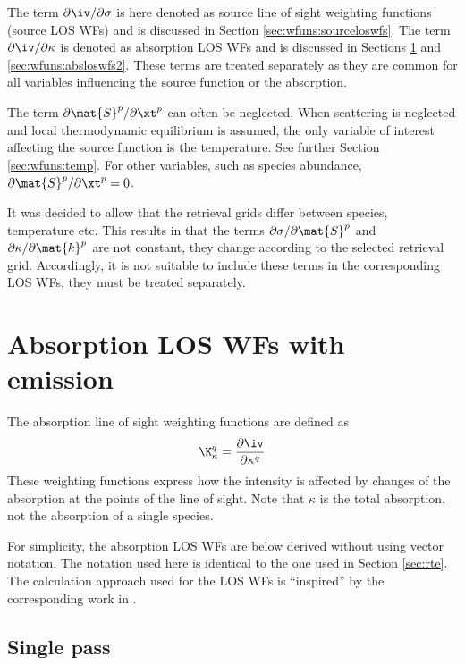   The term $\partial\iv / \partial \sigma$ is here denoted as source
  line of sight weighting functions (source LOS WFs) and is discussed
  in Section \ref{sec:wfuns:sourceloswfs}. The term $\partial\iv/
  \partial \kappa$ is denoted as absorption LOS WFs and is discussed
  in Sections \ref{sec:wfuns:absloswfs} and
  \ref{sec:wfuns:absloswfs2}. These terms are treated separately as
  they are common for all variables influencing the source function or
  the absorption.

  The term $\partial \mat{S}^p/\partial \xt^p$ can often be neglected.
  When scattering is neglected and local thermodynamic equilibrium is
  assumed, the only variable of interest affecting the source function
  is the temperature.  See further Section \ref{sec:wfuns:temp}. For
  other variables, such as species abundance, $\partial
  \mat{S}^p/\partial \xt^p=0$.
  
  It was decided to allow that the retrieval grids differ between
  species, temperature etc. This results in that the terms $\partial
  \sigma/ \partial \mat{S}^p$ and $\partial \kappa/ \partial
  \mat{k}^p$ are not constant, they change according to the selected
  retrieval grid. Accordingly, it is not suitable to include these terms
  in the corresponding LOS WFs, they must be treated separately.
  
  

\section{Absorption LOS WFs with emission}
 \label{sec:wfuns:absloswfs}

 The absorption line of sight weighting functions are defined as
 \begin{equation}
   \K_{\kappa}^q =  \frac{\partial\iv}{\partial \kappa^q}
  \label{eq:wfuns:loswfs}
 \end{equation}
 These weighting functions express how the intensity is
 affected by changes of the absorption at the points of the line of
 sight. Note that $\kappa$ is the total absorption, not the
 absorption of a single species. 
 
 For simplicity, the absorption LOS WFs are below derived without
 using vector notation. The notation used here is identical to the one
 used in Section \ref{sec:rte}. The calculation approach used for the
 LOS WFs is ``inspired'' by the corresponding work in
 \citet{master00}.


 \subsection{Single pass}
 \label{sec:wfuns:single}
 
